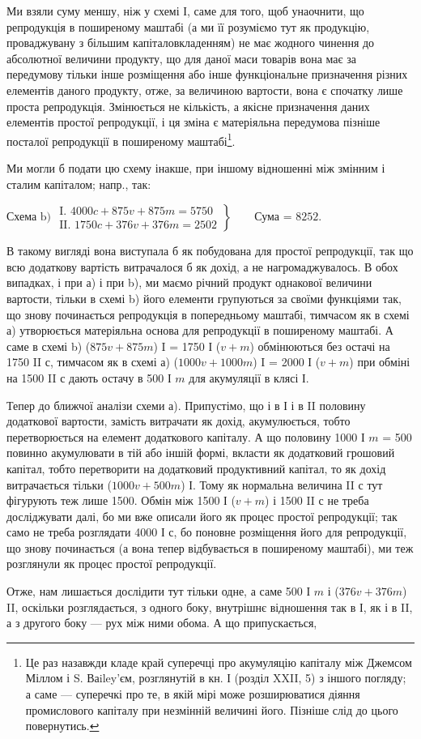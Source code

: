 \parcont{}  %
Ми взяли суму меншу, ніж у схемі І, саме для того, щоб унаочнити,
що репродукція в поширеному маштабі (а ми її розуміємо тут як продукцію,
проваджувану з більшим капіталовкладенням) не має жодного
чинення до абсолютної величини продукту, що для даної маси товарів
вона має за передумову тільки інше розміщення або інше функціональне
призначення різних елементів даного продукту, отже, за величиною вартости,
вона є спочатку лише проста репродукція. Змінюється не кількість,
а якісне призначення даних елементів простої репродукції, і ця зміна є
матеріяльна передумова пізніше посталої репродукції в поширеному
маштабі\footnote{
Це раз назавжди кладе край суперечці про акумуляцію капіталу між Джемсом
Міллом і S. Ваiley’єм, розглянутій в кн. І (розділ XXII, 5) з іншого
погляду; а саме — суперечкі про те, в якій мірі може розширюватися діяння промислового
капіталу при незмінній величині його. Пізніше слід до цього повернутись.
}.

Ми могли б подати цю схему інакше, при іншому відношенні між
змінним і сталим капіталом; напр., так:
\begin{center}
$
 \text{Схема b) } \left.\begin{aligned}
        \text{I. }4000 c + 875 v + 875 m = 5750\\
        \text{II. }1750 c + 376 v + 376 m = 2502
       \end{aligned}
 \right\}
 \qquad \text{Сума = 8252.}
$
\end{center}

В такому вигляді вона виступала б як побудована для простої репродукції,
так що всю додаткову вартість витрачалося б як дохід, а не нагромаджувалось.
В обох випадках, і при а) і при b), ми маємо річний
продукт однакової величини вартости, тільки в схемі b) його елементи
групуються за своїми функціями так, що знову починається репродукція
в попередньому маштабі, тимчасом як в схемі а) утворюється матеріяльна
основа для репродукції в поширеному маштабі. А саме в схемі b)
($875 v + 875 m$) I = 1750 І ($v + m$) обмінюються без остачі на
1750 II с, тимчасом як в схемі а) ($1000 v + 1000 m$) I = 2000 І
($v + m$) при обміні на 1500 II $с$ дають остачу в 500 І $m$ для акумуляції
в клясі І.

Тепер до ближчої аналізи схеми а). Припустімо, що і в І і в II половину
додаткової вартости, замість витрачати як дохід, акумулюється, тобто
перетворюється на елемент додаткового капіталу. А що половину 1000
І $m$ = 500 повинно акумулювати в тій або іншій формі, вкласти як додатковий
грошовий капітал, тобто перетворити на додатковий продуктивний
капітал, то як дохід витрачається тільки ($1000 v + 500 m$) І. Тому
як нормальна величина II $с$ тут фігурують теж лише 1500. Обмін між
1500 І ($v + m$) і 1500 II $с$ не треба досліджувати далі, бо ми вже описали
його як процес простої репродукції; так само не треба розглядати
4000 І $с$, бо поновне розміщення його для репродукції, що знову починається
(а вона тепер відбувається в поширеному маштабі), ми теж розглянули
як процес простої репродукції.

Отже, нам лишається дослідити тут тільки одне, а саме 500 І $m$ і
($376 v + 376 m$) II, оскільки розглядається, з одного боку, внутрішнє відношення
так в І, як і в II, а з другого боку — рух між ними обома. А що припускається,
\parbreak{}  %
